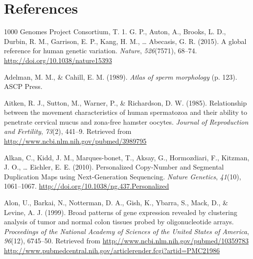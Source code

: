 \documentclass[12pt,twoside]{reedthesis}
\theoremstyle{definition}
\theoremstyle{definition}
\theoremstyle{remark}
\begin{document}
  \backmatter
  
  \chapter*{References}\label{references}
  
  \noindent
  
  \setlength{\parindent}{-0.20in} \setlength{\leftskip}{0.20in}
  \setlength{\parskip}{8pt}
  
  \hypertarget{refs}{}
  \hypertarget{ref-1000GenomesProjectConsortium2015}{}
  1000 Genomes Project Consortium, T. 1. G. P., Auton, A., Brooks, L. D.,
  Durbin, R. M., Garrison, E. P., Kang, H. M., \ldots{} Abecasis, G. R.
  (2015). A global reference for human genetic variation. \emph{Nature},
  \emph{526}(7571), 68--74. \url{http://doi.org/10.1038/nature15393}
  
  \hypertarget{ref-Adelman1989}{}
  Adelman, M. M., \& Cahill, E. M. (1989). \emph{Atlas of sperm
  morphology} (p. 123). ASCP Press.
  
  \hypertarget{ref-Aitken1985}{}
  Aitken, R. J., Sutton, M., Warner, P., \& Richardson, D. W. (1985).
  Relationship between the movement characteristics of human spermatozoa
  and their ability to penetrate cervical mucus and zona-free hamster
  oocytes. \emph{Journal of Reproduction and Fertility}, \emph{73}(2),
  441--9. Retrieved from \url{http://www.ncbi.nlm.nih.gov/pubmed/3989795}
  
  \hypertarget{ref-Alkan2010}{}
  Alkan, C., Kidd, J. M., Marques-bonet, T., Aksay, G., Hormozdiari, F.,
  Kitzman, J. O., \ldots{} Eichler, E. E. (2010). Personalized Copy-Number
  and Segmental Duplication Maps using Next-Generation Sequencing.
  \emph{Nature Genetics}, \emph{41}(10), 1061--1067.
  \url{http://doi.org/10.1038/ng.437.Personalized}
  
  \hypertarget{ref-Alon1999}{}
  Alon, U., Barkai, N., Notterman, D. A., Gish, K., Ybarra, S., Mack, D.,
  \& Levine, A. J. (1999). Broad patterns of gene expression revealed by
  clustering analysis of tumor and normal colon tissues probed by
  oligonucleotide arrays. \emph{Proceedings of the National Academy of
  Sciences of the United States of America}, \emph{96}(12), 6745--50.
  Retrieved from
  \href{http://www.ncbi.nlm.nih.gov/pubmed/10359783\%20http://www.pubmedcentral.nih.gov/articlerender.fcgi?artid=PMC21986}{http://www.ncbi.nlm.nih.gov/pubmed/10359783 http://www.pubmedcentral.nih.gov/articlerender.fcgi?artid=PMC21986}
  
\end{document}
